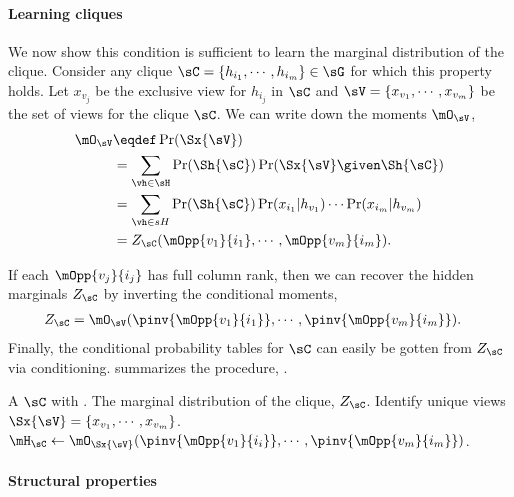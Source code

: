 \paragraph{Learning cliques}

We now show this condition is sufficient to learn the marginal
  distribution of the clique.
Consider any clique $\sC = \{h_{i_1}, \cdots, h_{i_m}\} \in \sG$ for which this property holds. Let
  $x_{v_j}$ be the exclusive view for $h_{i_j}$ in $\sC$ and $\sV
  = \{x_{v_1}, \cdots, x_{v_m}\}$ be the set of views for the clique
  $\sC$.
We can write down the moments $\mO_\sV$,
\begin{align*}
  \mO_\sV 
  &\eqdef \Pr(\Sx{\sV}) \\
  &= \sum_{\vh \in \sH}
      \Pr(\Sh{\sC}) \Pr(\Sx{\sV} \given \Sh{\sC}) \\
      &= \sum_{\vh \in sH} \Pr(\Sh{\sC}) 
          \Pr(x_{i_1} | h_{v_1}) \cdots \Pr(x_{i_m} | h_{v_m}) \\
    &= Z_{\sC}(\mOpp{v_1}{i_1},\cdots,\mOpp{v_m}{i_m}).
\end{align*}

If each $\mOpp{v_j}{i_j}$ has full column rank, then we can recover the
hidden marginals $Z_\sC$ by inverting the conditional moments,
\begin{align*}
  Z_{\sC} &= \mO_\sV(\pinv{\mOpp{v_1}{i_1}},\cdots,\pinv{\mOpp{v_m}{i_m}}).
\end{align*}
Finally, the conditional probability tables for $\sC$ can easily be gotten from
  $Z_\sC$ via conditioning.
 summarizes the procedure, \LearnClique.

\renewcommand{\algorithmicrequire}{\textbf{Input:}}
\renewcommand{\algorithmicensure}{\textbf{Output:}}
\begin{algorithm}
  \caption{\LearnClique}
  \label{algo:learnclique}
  \begin{algorithmic}
    \REQUIRE A $\sC$ with .
    \ENSURE The marginal distribution of the clique, $Z_\sC$.
      \STATE Identify unique views $\Sx{\sV} = \{x_{v_1}, \cdots, x_{v_m}\}$.
      \STATE $\mH_\sC \gets \mO_{\Sx{\sV}}( \pinv{\mOpp{v_1}{i_i}}, \cdots, \pinv{\mOpp{v_m}{i_m}} )$.
  \end{algorithmic}
\end{algorithm}

\paragraph{Structural properties}

